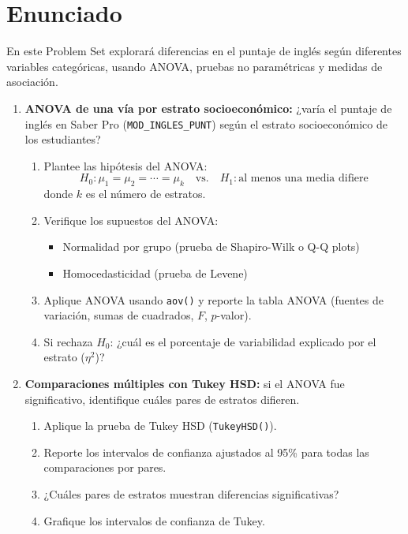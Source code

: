 \documentclass[11pt, a4paper]{article}
\begin{document}
\section*{Enunciado}

En este Problem Set explorar\'a diferencias en el puntaje de ingl\'es
seg\'un diferentes variables categ\'oricas, usando ANOVA, pruebas no
param\'etricas y medidas de asociaci\'on.

\begin{enumerate}[label=\arabic*)]
  \item \textbf{ANOVA de una v\'ia por estrato socioecon\'omico:} ¿var\'ia el
        puntaje de ingl\'es en Saber Pro (\texttt{MOD\_INGLES\_PUNT}) seg\'un el
        estrato socioecon\'omico de los estudiantes?
        \begin{enumerate}[label=\alph*)]
          \item Plantee las hip\'otesis del ANOVA:
                \[
                  H_0: \mu_1 = \mu_2 = \cdots = \mu_k \quad \text{vs.} \quad
                  H_1: \text{al menos una media difiere}
                \]
                donde $k$ es el n\'umero de estratos.
          \item Verifique los supuestos del ANOVA:
                \begin{itemize}
                  \item Normalidad por grupo (prueba de Shapiro-Wilk o Q-Q plots)
                  \item Homocedasticidad (prueba de Levene)
                \end{itemize}
          \item Aplique ANOVA usando \texttt{aov()} y reporte la tabla ANOVA
                (fuentes de variaci\'on, sumas de cuadrados, $F$, $p$-valor).
          \item Si rechaza $H_0$: ¿cu\'al es el porcentaje de variabilidad
                explicado por el estrato ($\eta^2$)?
        \end{enumerate}

  \item \textbf{Comparaciones m\'ultiples con Tukey HSD:} si el ANOVA fue
        significativo, identifique cu\'ales pares de estratos difieren.
        \begin{enumerate}[label=\alph*)]
          \item Aplique la prueba de Tukey HSD (\texttt{TukeyHSD()}).
          \item Reporte los intervalos de confianza ajustados al 95\% para
                todas las comparaciones por pares.
          \item ¿Cu\'ales pares de estratos muestran diferencias significativas?
          \item Grafique los intervalos de confianza de Tukey.
        \end{enumerate}


\end{enumerate}
\end{document}
